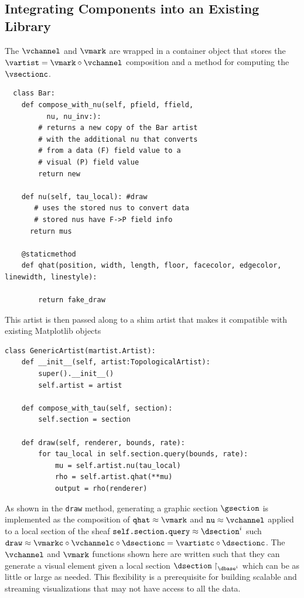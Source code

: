 \documentclass[10pt,journal,compsoc]{IEEEtran}
\theoremstyle{definition}
\theoremstyle{remark}
\begin{document}
\subsection{Integrating Components into an Existing Library}
The $\vchannel$ and $\vmark$ are wrapped in a container object that stores the $\vartist = \vmark \circ \vchannel$ composition and a method for computing the $\vsectionc$.
\begin{verbatim}
  class Bar: 
    def compose_with_nu(self, pfield, ffield, 
          nu, nu_inv:):
        # returns a new copy of the Bar artist 
        # with the additional nu that converts 
        # from a data (F) field value to a 
        # visual (P) field value
        return new

    def nu(self, tau_local): #draw
       # uses the stored nus to convert data
       # stored nus have F->P field info
      return mus
    
    @staticmethod
    def qhat(position, width, length, floor, facecolor, edgecolor, linewidth, linestyle):
       
        return fake_draw
\end{verbatim}

This artist is then passed along to a shim artist that makes it compatible with existing Matplotlib objects
\begin{verbatim}
class GenericArtist(martist.Artist):
    def __init__(self, artist:TopologicalArtist):
        super().__init__()
        self.artist = artist
        
    def compose_with_tau(self, section):
        self.section = section

    def draw(self, renderer, bounds, rate):
        for tau_local in self.section.query(bounds, rate): 
            mu = self.artist.nu(tau_local)
            rho = self.artist.qhat(**mu)
            output = rho(renderer)
\end{verbatim}
As shown in the \texttt{draw} method, generating a graphic section $\gsection$ is implemented as the composition of $\texttt{qhat} \approx \vmark$ and $\texttt{nu} \approx \vchannel$ applied to a local section of the sheaf $\texttt{self.section.query} \approx \dsection^{i}$ such  $\texttt{draw} \approx \vmarkc\circ\vchannelc\circ\dsectionc  = \vartistc\circ \dsectionc$. The $\vchannel$ and $\vmark$ functions shown here are written such that they can generate a visual element given a local section $\dsection\restriction_{\dbase^{i}}$ which can be as little or large as needed. This flexibility is a prerequisite for building scalable and streaming visualizations that may not have access to all the data.  
\end{document}
